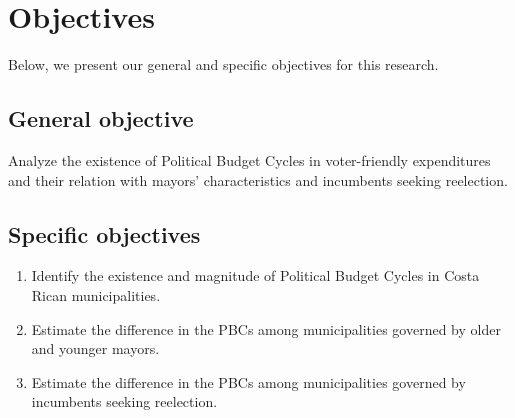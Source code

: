 \section{Objectives}


Below, we present our general and specific objectives for this research. 

\subsection{General objective}

Analyze the existence of Political Budget Cycles in voter-friendly expenditures and their relation with mayors' characteristics and incumbents seeking reelection. 

\subsection{Specific objectives}

\begin{enumerate}
	\item Identify the existence and magnitude of Political Budget Cycles in Costa Rican municipalities. 
	\item Estimate the difference in the PBCs among municipalities governed by older and younger mayors. 
	\item Estimate the difference in the PBCs among municipalities governed by incumbents seeking reelection. 
\end{enumerate}
